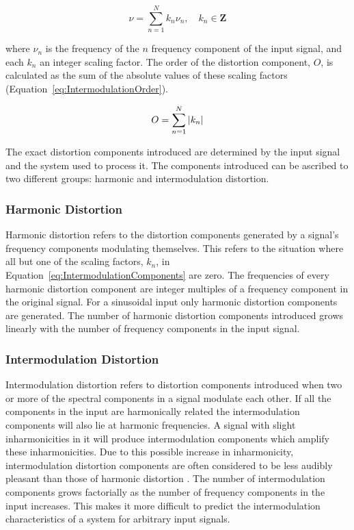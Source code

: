 		\begin{equation}
			\nu = \sum_{n = 1}^{N} k_{n}\nu_{n}, \quad k_{n} \in \textbf{Z}
			\label{eq:IntermodulationComponents}
		\end{equation}

		where $\nu_{n}$ is the frequency of the $n$ frequency component of the input signal, and each
		$k_{n}$ an integer scaling factor. The order of the distortion component, $O$, is calculated as the sum of
		the absolute values of these scaling factors (Equation~\ref{eq:IntermodulationOrder}).

		\begin{equation}
			O = \sum_{n = 1}^{N} \left|k_{n}\right|
			\label{eq:IntermodulationOrder}
		\end{equation}

		The exact distortion components introduced are determined by the input signal and the system used to
		process it. The components introduced can be ascribed to two different groups: harmonic and intermodulation
		distortion.

		\subsubsection*{Harmonic Distortion}
			Harmonic distortion refers to the distortion components generated by a signal's frequency
			components modulating themselves. This refers to the situation where all but one of the scaling
			factors, $k_{n}$, in Equation~\ref{eq:IntermodulationComponents} are zero. The frequencies of every
			harmonic distortion component are integer multiples of a frequency component in the original
			signal. For a sinusoidal input only harmonic distortion components are generated. The number of
			harmonic distortion components introduced grows linearly with the number of frequency components in
			the input signal.

		\subsubsection*{Intermodulation Distortion}
			Intermodulation distortion refers to distortion components introduced when two or more of the
			spectral components in a signal modulate each other. If all the components in the input are
			harmonically related the intermodulation components will also lie at harmonic frequencies. A signal
			with slight inharmonicities in it will produce intermodulation components which amplify these
			inharmonicities. Due to this possible increase in inharmonicity, intermodulation distortion
			components are often considered to be less audibly pleasant than those of harmonic distortion
			\citep{rumsey2009sound}. The number of intermodulation components grows factorially as the number
			of frequency components in the input increases. This makes it more difficult to predict the
			intermodulation characteristics of a system for arbitrary input signals.

